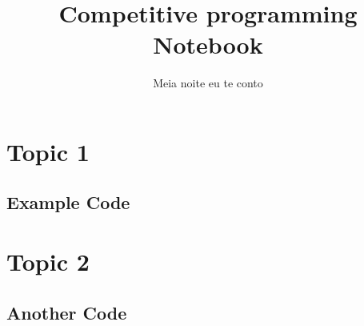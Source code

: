 \documentclass{article}
\title{Competitive programming Notebook \emoji{balloon} }
\author{Meia noite eu te conto}
\date{}
\newcommand\includes[2]{ 
   \subsection{#1}
   
}
\begin{document}
\maketitle
\thispagestyle{fancy}
\begin{multicols}{2}

\tableofcontents

\newpage

\section{Topic 1}
\includes{Example Code}{code/Topic 1/example_code.cpp}
\section{Topic 2}
\includes{Another Code}{code/Topic 2/another_code.cpp}

\end{multicols}
\end{document}
